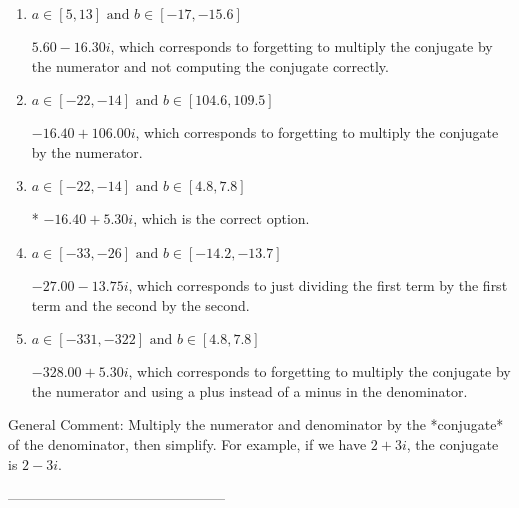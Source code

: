 \documentclass{article}[14pt]
\begin{document}
\begin{enumerate}[label=\Alph*.] 
\item $ a \in [5, 13] \text{ and } b \in [-17, -15.6] $ 

  $5.60  - 16.30 i$, which corresponds to forgetting to multiply the conjugate by the numerator and not computing the conjugate correctly. 
\item $ a \in [-22, -14] \text{ and } b \in [104.6, 109.5] $ 

  $-16.40  + 106.00 i$, which corresponds to forgetting to multiply the conjugate by the numerator. 
\item $ a \in [-22, -14] \text{ and } b \in [4.8, 7.8] $ 

 * $-16.40  + 5.30 i$, which is the correct option. 
\item $ a \in [-33, -26] \text{ and } b \in [-14.2, -13.7] $ 

  $-27.00  - 13.75 i$, which corresponds to just dividing the first term by the first term and the second by the second. 
\item $ a \in [-331, -322] \text{ and } b \in [4.8, 7.8] $ 

  $-328.00  + 5.30 i$, which corresponds to forgetting to multiply the conjugate by the numerator and using a plus instead of a minus in the denominator. 
\end{enumerate} 
 
General Comment: Multiply the numerator and denominator by the *conjugate* of the denominator, then simplify. For example, if we have $2+3i$, the conjugate is $2-3i$.

-----------------------------------------------
\end{document}
